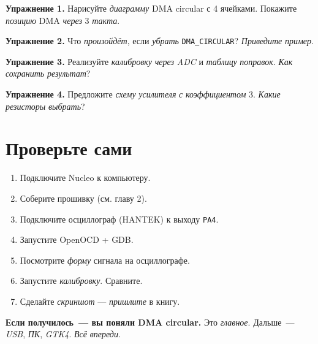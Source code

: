 \begin{exercisebox}
\textbf{Упражнение 1.} Нарисуйте \emph{диаграмму} DMA
circular с \num{4} ячейками. Покажите \emph{позицию}
DMA \emph{через} \num{3} \emph{такта}.
\end{exercisebox}

\begin{exercisebox}
\textbf{Упражнение 2.} Что \emph{произойдёт}, если
\emph{убрать} \texttt{DMA\_CIRCULAR}? \emph{Приведите}
\emph{пример}.
\end{exercisebox}

\begin{exercisebox}
\textbf{Упражнение 3.} Реализуйте \emph{калибровку}
\emph{через} \emph{ADC} и \emph{таблицу} \emph{поправок}.
\emph{Как} \emph{сохранить} \emph{результат}?
\end{exercisebox}

\begin{exercisebox}
\textbf{Упражнение 4.} Предложите \emph{схему} \emph{усилителя}
\emph{с} \emph{коэффициентом} \num{3}. \emph{Какие}
\emph{резисторы} \emph{выбрать}?
\end{exercisebox}

\section{Проверьте сами}
\label{sec:dac-dma-check}

\begin{enumerate}
    \item Подключите Nucleo к компьютеру.
    \item Соберите прошивку (см. главу 2).
    \item Подключите осциллограф (HANTEK) к выходу \texttt{PA4}.
    \item Запустите OpenOCD + GDB.
    \item Посмотрите \emph{форму} сигнала на осциллографе.
    \item Запустите \emph{калибровку}. Сравните.
    \item Сделайте \emph{скриншот} — \emph{пришлите} в книгу.
\end{enumerate}

\begin{ideabox}
\textbf{Если получилось~--- вы поняли DMA circular.}
Это \emph{главное}. Дальше~--- \emph{USB}, \emph{ПК},
\emph{GTK4}. \emph{Всё} \emph{впереди}.
\end{ideabox}
